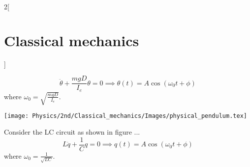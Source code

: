 \documentclass[../../../main.tex]{subfiles}
\begin{document}
\begin{multicols}{2}[\section{Classical mechanics}]
\begin{prop}
    $$\ddot{\theta}+\frac{mgD}{I_e}\theta=0\implies\theta(t)=A\cos(\omega_0t+\phi)$$ where $\omega_0=\sqrt{\frac{mgD}{I_e}}$.
    \begin{center}
      \begin{minipage}{\linewidth}
        \centering
        \texttt{[image: Physics/2nd/Classical\_mechanics/Images/physical\_pendulum.tex]}
        \label{CM_fig3}
      \end{minipage}
    \end{center}
  \end{prop}
  \begin{prop}
    Consider the LC circuit as shown in figure ...
    $$L\ddot{q}+\frac{1}{C}q=0\implies q(t)=A\cos(\omega_0t+\phi)$$ where $\omega_0=\frac{1}{\sqrt{LC}}$.
  \end{prop}

\end{multicols}
\end{document}
